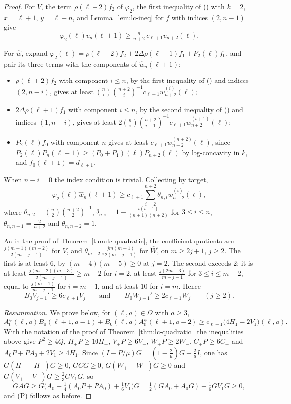 \documentclass[twoside,10pt]{article}
\numberwithin{equation}{section}
\theoremstyle{slbody}
\theoremstyle{definition}
\theoremstyle{remark}
\renewcommand{\eqref}[1]{\textup{{\normalfont(\oldstylenums{\ref{#1}}}\normalfont)}}
\begin{document}
\begin{proof}
For $V$, the term $\rho(\ell+2)f_2$ of $\varphi_2$, the first inequality of \eqref{eq:G-ratio} with $k=2$, $x=\ell+1$, $y=\ell+n$, and Lemma~\ref{lem:lc-ineq} for $f$ with indices $(2,n-1)$ give
\[
\varphi_2(\ell)v_n(\ell+1)\geq\tfrac n{n+2}\,c_{\ell+1}v_{n+2}(\ell).
\]

For $\widehat w$, expand $\varphi_2(\ell)=\rho(\ell+2)f_2+2\Delta\rho(\ell+1)f_1+P_2(\ell)f_0$, and pair its three terms with the components of $\widehat w_n(\ell+1)$:
\begin{itemize}
\item $\rho(\ell+2)f_2$ with component $i\leq n$, by the first inequality of \eqref{eq:G-ratio} and indices $(2,n-i)$, gives at least $\binom ni\binom{n+2}i^{-1}c_{\ell+1}w^{(i)}_{n+2}(\ell)$;
\item $2\Delta\rho(\ell+1)f_1$ with component $i\leq n$, by the second inequality of \eqref{eq:G-ratio} and indices $(1,n-i)$, gives at least $2\binom ni\binom{n+2}{i+1}^{-1}c_{\ell+1}w^{(i+1)}_{n+2}(\ell)$;
\item $P_2(\ell)f_0$ with component $n$ gives at least $c_{\ell+1}w^{(n+2)}_{n+2}(\ell)$, since $P_2(\ell)P_n(\ell+1)\geq(P_0+P_1)(\ell)P_{n+2}(\ell)$ by log-concavity in $k$, and $f_0(\ell+1)=d_{\ell+1}$.
\end{itemize}
When $n-i=0$ the index condition is trivial. Collecting by target,
\[
\varphi_2(\ell)\widehat w_n(\ell+1)\geq c_{\ell+1}\sum_{i=2}^{n+2}\theta_{n,i}w^{(i)}_{n+2}(\ell),
\]
where $\theta_{n,2}=\binom n2\binom{n+2}2^{-1}$, $\theta_{n,i}=1-\frac{i(i-1)}{(n+1)(n+2)}$ for $3\leq i\leq n$, $\theta_{n,n+1}=\frac2{n+2}$ and $\theta_{n,n+2}=1$.

As in the proof of Theorem~\ref{thm:lc-quadratic}, the coefficient quotients are $\frac{j(m-1)(m-2)}{2(m-j-1)}$ for $V$, and $\theta_{m-2,i}\frac{jm(m-1)}{2(m-j-1)}$ for $\widehat W$, on $m\geq2j+1$, $j\geq2$. The first is at least $6$, by $(m-4)(m-5)\geq0$ at $j=2$. The second exceeds $2$: it is at least $\frac{j(m-2)(m-3)}{2(m-j-1)}\geq m-2$ for $i=2$, at least $\frac{j(2m-3)}{m-j-1}$ for $3\leq i\leq m-2$, equal to $\frac{j(m-1)}{m-j-1}$ for $i=m-1$, and at least $10$ for $i=m$. Hence
\[
B_0V_{j-1}'\geq6c_{\ell+1}V_j\qquad\text{and}\qquad B_0W_{j-1}'\geq2c_{\ell+1}W_j\qquad(j\geq2).
\]

\emph{Resummation.} We prove below, for $(\ell,a)\in\Omega$ with $a\geq3$,
\begin{equation}\label{eq:G-key}
A^\psi_0(\ell,a)B_0(\ell+1,a-1)+B_0(\ell,a)A^\psi_0(\ell+1,a-2)\geq c_{\ell+1}\bigl(4H_1-2V_1\bigr)(\ell,a).
\end{equation}
With the notation of the proof of Theorem~\ref{thm:lc-quadratic}, the inequalities above give $P^2\geq4Q$, $H_+P\geq10H_-$, $V_+P\geq6V_-$, $W_+P\geq2W_-$, $C_+P\geq6C_-$ and $A_0P+PA_0+2V_1\geq4H_1$. Since $(I-P/\mu)G=(1-\frac2\mu)G+\frac2\mu I$, one has $G(H_+-H_-)G\geq0$, $GCG\geq0$, $G(W_+-W_-)G\geq0$ and $G(V_+-V_-)G\geq\frac23GV_1G$, so
\[
GAG\geq G\bigl(A_0-\tfrac14(A_0P+PA_0)+\tfrac16V_1\bigr)G=\tfrac12(GA_0+A_0G)+\tfrac16GV_1G\geq0,
\]
and (P) follows as before.


\end{proof}
\end{document}

